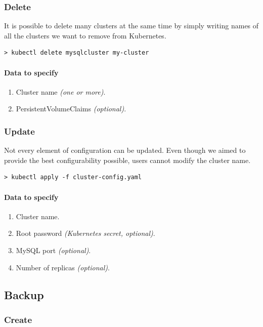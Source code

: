 \subsubsection*{Delete}

It is possible to delete many clusters at the same time by simply writing
names of all the clusters we want to remove from Kubernetes.

\begin{lstlisting}
> kubectl delete mysqlcluster my-cluster
\end{lstlisting}

\paragraph{Data to specify}
\begin{enumerate}
	\item Cluster name \textit{(one or more)}.
	\item PersistentVolumeClaims \textit{(optional)}.
\end{enumerate}

\subsubsection*{Update}

Not every element of configuration can be updated. Even though we aimed
to provide the best configurability possible, users cannot modify the
cluster name.

\begin{lstlisting}
> kubectl apply -f cluster-config.yaml
\end{lstlisting}

\paragraph{Data to specify}
\begin{enumerate}
	\item Cluster name.
	\item Root password \textit{(Kubernetes secret, optional)}.
	\item MySQL port \textit{(optional)}.
	\item Number of replicas \textit{(optional)}.
\end{enumerate}

\subsection{Backup}
\subsubsection*{Create}

